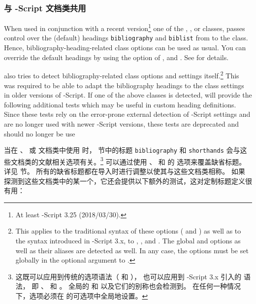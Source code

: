 \subsubsection{与 -Script 文档类共用}
\label{use:cav:scr}

When used in conjunction with a recent version\footnote{At least -Script 3.25 (2018/03/30).} one of the , , or  classes, \biblatex passes control over the (default) headings \texttt{bibliography} and \texttt{biblist} from  to the class. Hence, bibliography-heading-related class options can be used as usual. You can override the default headings by using the  option of ,  and . See  for details.

\biblatex also tries to detect bibliography-related class options and settings itself.\footnote{This applies to the traditional syntax of these options ( and ) as well as to the \keyval syntax introduced in -Script 3.x, \ie to , , and . The global  and  options as well as their aliases are detected as well. In any case, the options must be set globally in the optional argument to .} This was required to be able to adapt the bibliography headings to the class settings in older versions of -Script. If one of the above classes is detected, \biblatex will provide the following additional tests which may be useful in custom heading definitions. Since these tests rely on the error-prone external detection of -Script settings and are no longer used with newer -Script versions, these tests are deprecated and should no longer be use


当在 、 或  文档类中使用 \biblatex 时，
 节中的标题 \texttt{bibliography} 和 \texttt{shorthands} 会与这些文档类的文献相关选项有关。\footnote{%
	这既可以应用到传统的选项语法（ 和 ），
	也可以应用到 -Script 3.x 引入的 \keyval 语法，
	即 、 和 。
	全局的  和  以及它们的别称也会检测到。
	在任何一种情况下，选项必须在  的可选项中全局地设置。
}
可以通过使用 、 和  的  选项来覆盖缺省标题。
详见  节。
所有的缺省标题都在导入时进行调整以使其与这些文档类相称。
如果 \biblatex 探测到这些文档类中的某一个，它还会提供以下额外的测试，这对定制标题定义很有用：

